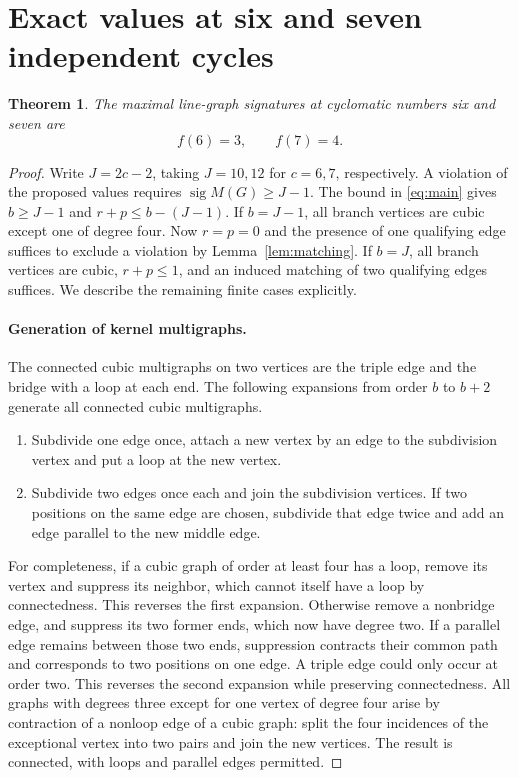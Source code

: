 \documentclass[11pt]{article}
\newtheorem{theorem}{Theorem}[section]
\newcommand{\sg}{\operatorname{sig}}
\begin{document}
\section{Exact values at six and seven independent cycles}
\begin{theorem}\label{th:vals}
The maximal line-graph signatures at cyclomatic numbers six and seven are
\[
f(6)=3,\qquad f(7)=4.
\]
\end{theorem}
\begin{proof}
Write $J=2c-2$, taking $J=10,12$ for $c=6,7$, respectively. A violation of the proposed values requires $\sg M(G)\ge J-1$. The bound in \eqref{eq:main} gives $b\ge J-1$ and $r+p\le b-(J-1)$. If $b=J-1$, all branch vertices are cubic except one of degree four. Now $r=p=0$ and the presence of one qualifying edge suffices to exclude a violation by Lemma~\ref{lem:matching}. If $b=J$, all branch vertices are cubic, $r+p\le1$, and an induced matching of two qualifying edges suffices. We describe the remaining finite cases explicitly.

\paragraph{Generation of kernel multigraphs.}
The connected cubic multigraphs on two vertices are the triple edge and the bridge with a loop at each end. The following expansions from order $b$ to $b+2$ generate all connected cubic multigraphs.
\begin{enumerate}
\item Subdivide one edge once, attach a new vertex by an edge to the subdivision vertex and put a loop at the new vertex.
\item Subdivide two edges once each and join the subdivision vertices. If two positions on the same edge are chosen, subdivide that edge twice and add an edge parallel to the new middle edge.
\end{enumerate}
For completeness, if a cubic graph of order at least four has a loop, remove its vertex and suppress its neighbor, which cannot itself have a loop by connectedness. This reverses the first expansion. Otherwise remove a nonbridge edge, and suppress its two former ends, which now have degree two. If a parallel edge remains between those two ends, suppression contracts their common path and corresponds to two positions on one edge. A triple edge could only occur at order two. This reverses the second expansion while preserving connectedness. All graphs with degrees three except for one vertex of degree four arise by contraction of a nonloop edge of a cubic graph: split the four incidences of the exceptional vertex into two pairs and join the new vertices. The result is connected, with loops and parallel edges permitted.


\end{proof}
\end{document}
